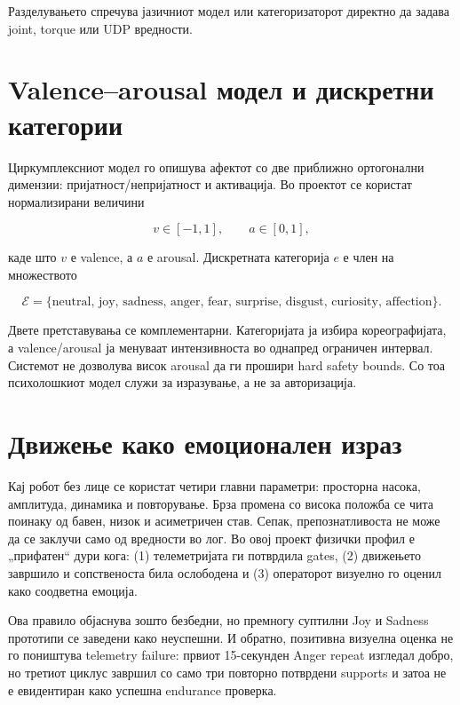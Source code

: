 Разделувањето спречува јазичниот модел или категоризаторот директно да задава
joint, torque или UDP вредности.

\section{Valence--arousal модел и дискретни категории}

Циркумплексниот модел го опишува афектот со две приближно ортогонални димензии:
пријатност/непријатност и активација. Во проектот
се користат нормализирани величини

\begin{equation}
  v \in [-1,1], \qquad a \in [0,1],
  \label{eq:va-bounds}
\end{equation}

каде што $v$ е valence, а $a$ е arousal. Дискретната категорија
$e$ е член на множеството

\begin{equation}
  \mathcal{E}=\{\text{neutral, joy, sadness, anger, fear, surprise, disgust,
  curiosity, affection}\}.
  \label{eq:emotion-set}
\end{equation}

Двете претставувања се комплементарни. Категоријата ја избира кореографијата,
а valence/arousal ја менуваат интензивноста во однапред ограничен интервал.
Системот не дозволува висок arousal да ги прошири hard safety bounds. Со тоа
психолошкиот модел служи за изразување, а не за авторизација.

\section{Движење како емоционален израз}

Кај робот без лице се користат четири главни параметри: просторна насока,
амплитуда, динамика и повторување. Брза промена со висока положба се чита
поинаку од бавен, низок и асиметричен став. Сепак, препознатливоста не може да
се заклучи само од вредности во лог. Во овој проект физички профил е
„прифатен“ дури кога: (1) телеметријата ги потврдила gates, (2) движењето
завршило и сопственоста била ослободена и (3) операторот визуелно го оценил
како соодветна емоција.

Ова правило објаснува зошто безбедни, но премногу суптилни Joy и Sadness
прототипи се заведени како неуспешни. И обратно, позитивна визуелна оценка не
го поништува telemetry failure: првиот 15-секунден Anger repeat изгледал добро,
но третиот циклус завршил со само три повторно потврдени supports и затоа не е
евидентиран како успешна endurance проверка.

